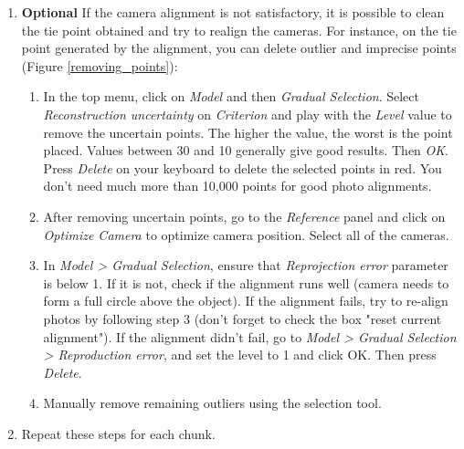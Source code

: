 \documentclass[10pt,letter,english]{article}
\begin{document}
\begin{enumerate}
    \item \textbf{Optional} If the camera alignment is not satisfactory, it is possible to clean the tie point obtained and try to realign the cameras. For instance, on the tie point generated by the alignment, you can delete outlier and imprecise points (Figure \ref{removing_points}): 
    \begin{enumerate}
        \item In the top menu, click on \textit{Model} and then \textit{Gradual Selection}. Select \textit{Reconstruction uncertainty} on \textit{Criterion} and play with the \textit{Level} value to remove the uncertain points. The higher the value, the worst is the point placed. Values between 30 and 10 generally give good results. Then \textit{OK}. Press \textit{Delete} on your keyboard to delete the selected points in red. You don't need much more than 10,000 points for good photo alignments.
        \item After removing uncertain points, go to the \textit{Reference} panel and click on \textit{Optimize Camera} to optimize camera position. Select all of the cameras. 
        \item In \textit{Model > Gradual Selection}, ensure that \textit{Reprojection error} parameter is below 1. If it is not, check if the alignment runs well (camera needs to form a full circle above the object). If the alignment fails, try to re-align photos by following step 3 (don't forget to check the box "reset current alignment"). If the alignment didn't fail, go to \textit{Model > Gradual Selection > Reproduction error}, and set the level to 1 and click OK. Then press \textit{Delete}. 
        \item Manually remove remaining outliers using the selection tool.
    \end{enumerate} 
    \item Repeat these steps for each chunk.
\end{enumerate}
\end{document}
